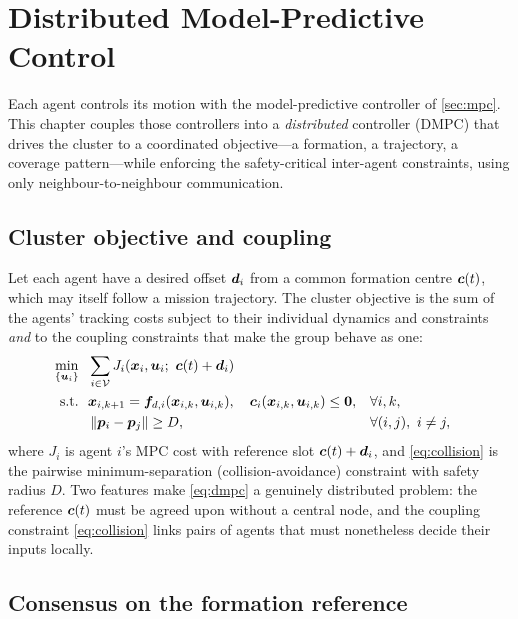 \chapter{Distributed Model-Predictive Control}
\label{ch:dmpc}

Each agent controls its motion with the model-predictive controller of
\cref{sec:mpc}. This chapter couples those controllers into a \emph{distributed}
controller (DMPC) that drives the cluster to a coordinated objective---a
formation, a trajectory, a coverage pattern---while enforcing the safety-critical
inter-agent constraints, using only neighbour-to-neighbour communication.

\section{Cluster objective and coupling}

Let each agent have a desired offset $\bm{d}_i$ from a common formation centre
$\bm{c}(t)$, which may itself follow a mission trajectory. The cluster objective
is the sum of the agents' tracking costs subject to their individual dynamics and
constraints \emph{and} to the coupling constraints that make the group
behave as one:
\begin{subequations}
\label{eq:dmpc}
\begin{align}
\min_{\{\ctrl_i\}}\ \ &\sum_{i\in\mathcal V}J_i(\state_i,\ctrl_i;\ \vv{c}(t)+\vv{d}_i)\\
\text{s.t.}\ \ &\state_{i,k+1}=\vv{f}_{d,i}(\state_{i,k},\ctrl_{i,k}),\quad
\vv{c}_i(\state_{i,k},\ctrl_{i,k})\le\vv{0}, && \forall i,k,\\
&\norm{\vv{p}_i-\vv{p}_j}\ge D, && \forall (i,j),\ i\ne j,
\label{eq:collision}
\end{align}
\end{subequations}
where $J_i$ is agent $i$'s MPC cost with reference slot $\bm{c}(t)+\bm{d}_i$, and
\cref{eq:collision} is the pairwise minimum-separation (collision-avoidance)
constraint with safety radius $D$. Two features make \cref{eq:dmpc} a genuinely
distributed problem: the reference $\bm{c}(t)$ must be agreed upon without a
central node, and the coupling constraint \cref{eq:collision} links pairs of
agents that must nonetheless decide their inputs locally.

\section{Consensus on the formation reference}

